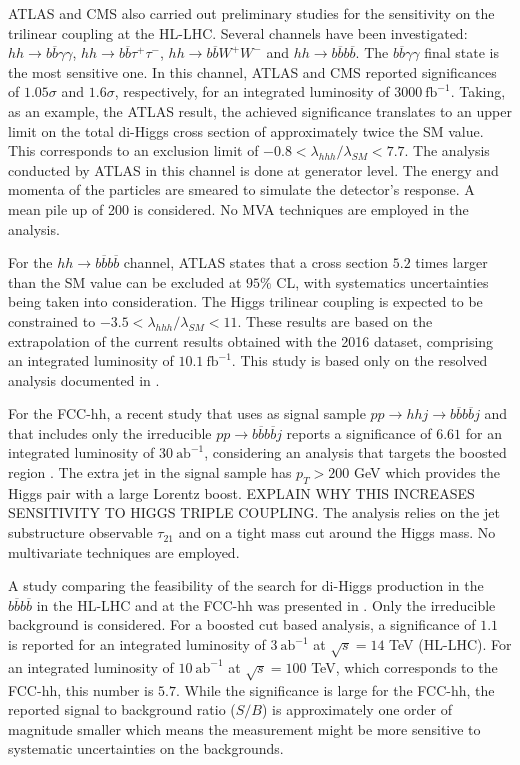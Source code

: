 ATLAS and CMS also carried out preliminary studies for the sensitivity on the trilinear coupling at the HL-LHC. Several channels have been investigated: $hh\rightarrow  b\overline{b}\gamma\gamma$, $hh\rightarrow b\overline{b} \tau^+ \tau^-$, $hh\rightarrow b\overline{b} W^+ W^-$ and $hh\rightarrow  b\overline{b}b\overline{b}$. The $b\overline{b}\gamma\gamma$ final state is the most sensitive one. In this channel, ATLAS and CMS reported significances of $1.05\sigma$ and $1.6\sigma$, respectively, for an integrated luminosity of $3000~\text{fb}^{-1}$. Taking, as an example, the ATLAS result, the achieved significance translates to an upper limit on the total di-Higgs cross section of approximately twice the SM value. This corresponds to an exclusion limit of $-0.8<\lambda_{hhh}/\lambda_{SM}<7.7$. The analysis conducted by ATLAS in this channel is done at generator level. The energy and momenta of the particles are smeared to simulate the detector's response. A mean pile up of 200 is considered. No MVA techniques are employed in the analysis. 

For the $hh\rightarrow  b\overline{b}b\overline{b}$ channel, ATLAS states that a cross section $5.2$ times larger than the SM value can be excluded at $95\%$ CL, with systematics uncertainties being taken into consideration. The Higgs trilinear coupling is expected to be constrained to $-3.5<\lambda_{hhh}/\lambda_{SM}<11$. These results are based on the extrapolation of the current results obtained with the 2016 dataset, comprising an integrated luminosity of $10.1~\text{fb}^{-1}$. This study is based only on the resolved analysis documented in \cite{hh2bbbbATLAS}.

For the FCC-hh, a recent study that uses as signal sample $pp\rightarrow hhj\rightarrow b\overline{b}b\overline{b}j$ and that includes only the irreducible $pp\rightarrow b\overline{b}b\overline{b}j$ reports a significance of $6.61$ for an integrated luminosity of $30~\text{ab}^{-1}$, considering an analysis that targets the boosted region \cite{hh+jet_100TeV}. The extra jet in the signal sample has $p_T>200$ GeV which provides the Higgs pair with a large Lorentz boost. EXPLAIN WHY THIS INCREASES SENSITIVITY TO HIGGS TRIPLE COUPLING. The analysis relies on the jet substructure observable $\tau_{21}$ and on a tight mass cut around the Higgs mass. No multivariate techniques are employed. 

A study comparing the feasibility of the search for di-Higgs production in the $b\overline{b}b\overline{b}$ in the HL-LHC and at the FCC-hh was presented in \cite{hhFeasibility1_100TeV}. Only the irreducible background is considered. For a boosted cut based analysis, a significance of $1.1$ is reported for an integrated luminosity of $3~\text{ab}^{-1}$ at $\sqrt{s}=14$ TeV (HL-LHC). For an integrated luminosity of $10~\text{ab}^{-1}$ at $\sqrt{s}=100$ TeV, which corresponds to the FCC-hh, this number is $5.7$. While the significance is large for the FCC-hh, the reported signal to background ratio ($S/B$) is approximately one order of magnitude smaller which means the measurement might be more sensitive to systematic uncertainties on the backgrounds. 

